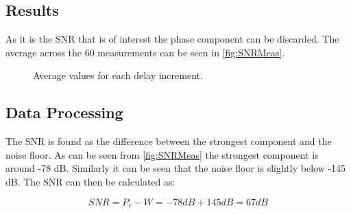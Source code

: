 \subsection{Results}
As it is the SNR that is of interest the phase component can be discarded. The average across the 60 measurements can be seen in \autoref{fig:SNRMeas}.

\begin{figure}[H]
\centering

\caption{Average values for each delay increment.}
\label{fig:SNRMeas}
\end{figure}

\subsection{Data Processing}
The SNR is found as the difference between the strongest component and the noise floor. As can be seen from \autoref{fig:SNRMeas} the strongest component is around -78 dB. Similarly it can be seen that the noise floor is slightly below -145 dB. The SNR can then be calculated as:

\begin{equation}
SNR = P_r - W = -78dB + 145dB = 67 dB
\end{equation}
\begin{where}
\end{where}
